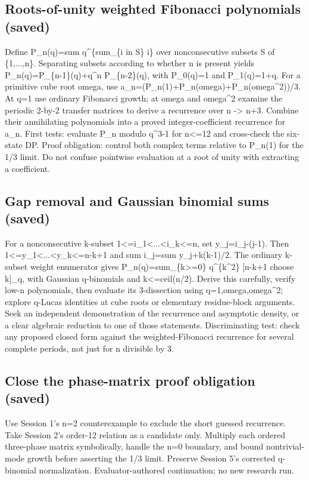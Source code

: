 \documentclass[11pt]{article}
\begin{document}
\subsection{Roots-of-unity weighted Fibonacci polynomials (saved)}
Define P\_n(q)=sum q\textasciicircum{}\{sum\_\{i in S\} i\} over nonconsecutive subsets S of \{1,...,n\}. Separating subsets according to whether n is present yields P\_n(q)=P\_\{n-1\}(q)+q\textasciicircum{}n P\_\{n-2\}(q), with P\_0(q)=1 and P\_1(q)=1+q. For a primitive cube root omega, use a\_n=(P\_n(1)+P\_n(omega)+P\_n(omega\textasciicircum{}2))/3. At q=1 use ordinary Fibonacci growth; at omega and omega\textasciicircum{}2 examine the periodic 2-by-2 transfer matrices to derive a recurrence over n -\textgreater{} n+3. Combine their annihilating polynomials into a proved integer-coefficient recurrence for a\_n. First tests: evaluate P\_n modulo q\textasciicircum{}3-1 for n\textless{}=12 and cross-check the six-state DP. Proof obligation: control both complex terms relative to P\_n(1) for the 1/3 limit. Do not confuse pointwise evaluation at a root of unity with extracting a coefficient.\par
\subsection{Gap removal and Gaussian binomial sums (saved)}
For a nonconsecutive k-subset 1\textless{}=i\_1\textless{}...\textless{}i\_k\textless{}=n, set y\_j=i\_j-(j-1). Then 1\textless{}=y\_1\textless{}...\textless{}y\_k\textless{}=n-k+1 and sum i\_j=sum y\_j+k(k-1)/2. The ordinary k-subset weight enumerator gives P\_n(q)=sum\_\{k\textgreater{}=0\} q\textasciicircum{}\{k\textasciicircum{}2\} [n-k+1 choose k]\_q, with Gaussian q-binomials and k\textless{}=ceil(n/2). Derive this carefully, verify low-n polynomials, then evaluate its 3-dissection using q=1,omega,omega\textasciicircum{}2; explore q-Lucas identities at cube roots or elementary residue-block arguments. Seek an independent demonstration of the recurrence and asymptotic density, or a clear algebraic reduction to one of those statements. Discriminating test: check any proposed closed form against the weighted-Fibonacci recurrence for several complete periods, not just for n divisible by 3.\par
\subsection{Close the phase-matrix proof obligation (saved)}
Use Session 1's n=2 counterexample to exclude the short guessed recurrence. Take Session 2's order-12 relation as a candidate only. Multiply each ordered three-phase matrix symbolically, handle the n=0 boundary, and bound nontrivial-mode growth before asserting the 1/3 limit. Preserve Session 5's corrected q-binomial normalization. Evaluator-authored continuation; no new research run.\par
\end{document}
